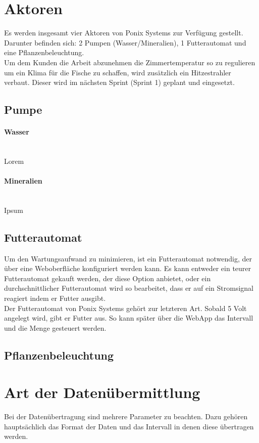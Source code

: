 \documentclass[11pt]{article}
\begin{document}
\newpage
\section{Aktoren}
Es werden insgesamt vier Aktoren von Ponix Systems zur Verfügung gestellt. Darunter befinden sich: 2 Pumpen (Wasser/Mineralien), 1 Futterautomat und eine Pflanzenbeleuchtung. \\
Um dem Kunden die Arbeit abzunehmen die Zimmertemperatur so zu regulieren um ein Klima für die Fische zu schaffen, wird zusätzlich ein Hitzestrahler verbaut. Dieser wird im nächsten Sprint (Sprint 1) geplant und eingesetzt.
\subsection{Pumpe}
\paragraph{Wasser}\mbox{} \\
Lorem
\paragraph{Mineralien}\mbox{} \\
Ipsum
\subsection{Futterautomat}
Um den Wartungsaufwand zu minimieren, ist ein Futterautomat notwendig, der über eine Weboberfläche konfiguriert werden kann. Es kann entweder ein teurer Futterautomat gekauft werden, der diese Option anbietet, oder ein durchschnittlicher Futterautomat wird so bearbeitet, dass er auf ein Stromsignal reagiert indem er Futter ausgibt. \\
Der Futterautomat von Ponix Systems gehört zur letzteren Art. Sobald 5 Volt angelegt wird, gibt er Futter aus. So kann später über die WebApp das Intervall und die Menge gesteuert werden.
\subsection{Pflanzenbeleuchtung}

\newpage
\section{Art der Daten\"ubermittlung}
Bei der Daten\"ubertragung sind mehrere Parameter zu beachten. Dazu geh\"oren haupts\"achlich das Format der Daten und das Intervall in denen diese \"ubertragen werden.
\end{document}
